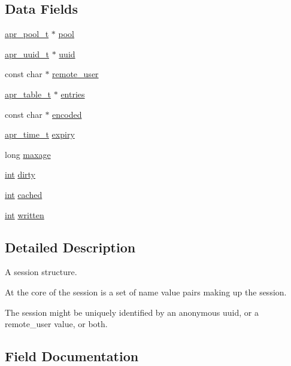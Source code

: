 \subsection*{Data Fields}
\begin{DoxyCompactItemize}
\item 
\hyperlink{structapr__pool__t}{apr\+\_\+pool\+\_\+t} $\ast$ \hyperlink{structsession__rec_a3caa374176da90fd14e7c1ea6faeba62}{pool}
\item 
\hyperlink{structapr__uuid__t}{apr\+\_\+uuid\+\_\+t} $\ast$ \hyperlink{structsession__rec_a74e24cb5d55803cad5c6a378edce7780}{uuid}
\item 
const char $\ast$ \hyperlink{structsession__rec_a59c801dd4298d4714e0cdf22482c94ed}{remote\+\_\+user}
\item 
\hyperlink{structapr__table__t}{apr\+\_\+table\+\_\+t} $\ast$ \hyperlink{structsession__rec_a55b3373a373c6fd6b1fbae64f8c7acbe}{entries}
\item 
const char $\ast$ \hyperlink{structsession__rec_a9395cdce01d38ed6213e9c2961602f87}{encoded}
\item 
\hyperlink{group__apr__time_gadb4bde16055748190eae190c55aa02bb}{apr\+\_\+time\+\_\+t} \hyperlink{structsession__rec_a2ed49b7049f4fa82fc1815155c6853d9}{expiry}
\item 
long \hyperlink{structsession__rec_abdcb14b183b02e3855766964e9967043}{maxage}
\item 
\hyperlink{pcre_8txt_a42dfa4ff673c82d8efe7144098fbc198}{int} \hyperlink{structsession__rec_ab17516ef90fd2adf786c6a3ad017cc05}{dirty}
\item 
\hyperlink{pcre_8txt_a42dfa4ff673c82d8efe7144098fbc198}{int} \hyperlink{structsession__rec_afe2e0c297fe9e288732ff8fa32975f12}{cached}
\item 
\hyperlink{pcre_8txt_a42dfa4ff673c82d8efe7144098fbc198}{int} \hyperlink{structsession__rec_a446d4da0ca8ae461bc9b18b322c1c8bc}{written}
\end{DoxyCompactItemize}


\subsection{Detailed Description}
A session structure.

At the core of the session is a set of name value pairs making up the session.

The session might be uniquely identified by an anonymous uuid, or a remote\+\_\+user value, or both. 

\subsection{Field Documentation}
